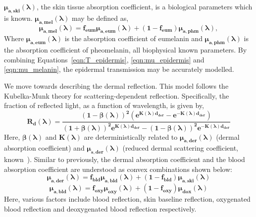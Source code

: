 $\mathbf{\boldsymbol\mu_{a,ski}(\boldsymbol\lambda)}$, the skin tissue absorption coefficient, is a biological parameters which is known. $\mathbf{\boldsymbol\mu_{a,mel}(\boldsymbol\lambda)}$ may be defined as,
\begin{equation} \label{eqn:mu_melanin}
    \mathbf{\boldsymbol\mu_{a,mel}(\boldsymbol\lambda)=f_{eum}\boldsymbol\mu_{a,eum}(\boldsymbol\lambda)+(1-f_{eum})\boldsymbol\mu_{a,phm}(\boldsymbol\lambda)},
\end{equation}
Where ${\mathbf{\boldsymbol\mu_{a,eum}(\boldsymbol\lambda)}}$ is the absorption coefficient of eumelanin and $\mathbf{\boldsymbol\mu_{a,phm}(\boldsymbol\lambda)}$ is the absorption coefficient of pheomelanin, all biophysical known parameters. By combining Equations~\ref{eqn:T_epidermis}, \ref{eqn:mu_epidermis} and \ref{eqn:mu_melanin}, the epidermal transmission may be accurately modelled.

We move towards describing the dermal reflection. This model follows the Kubelka-Munk theory for scattering-dependent reflection. Specifically, the fraction of reflected light, as a function of wavelength, is given by,
\begin{equation}
    \mathbf{R_{d}(\boldsymbol\lambda)=\frac{(1-\boldsymbol\beta(\boldsymbol\lambda))^2(e^{K(\boldsymbol\lambda)d_{der}}-e^{-K(\boldsymbol\lambda)d_{der}})}{(1+\boldsymbol\beta(\boldsymbol\lambda))^2e^{K(\boldsymbol\lambda)d_{der}}-(1-\boldsymbol\beta(\boldsymbol\lambda))^2e^{-K(\boldsymbol\lambda)d_{der}}}}
\end{equation}
Here, $\mathbf{\boldsymbol\beta(\boldsymbol\lambda)}$ and $\mathbf{K(\boldsymbol\lambda)}$ are deterministically related to $\mathbf{\boldsymbol\mu_{a,der}(\boldsymbol\lambda)}$ (dermal absorption coefficient) and $\mathbf{\boldsymbol\mu_{s,der}(\boldsymbol\lambda)}$ (reduced dermal scattering coefficient, known~\cite{anderson_optics_1981}). Similar to previously, the dermal absorption coefficient and the blood absorption coefficient are understood as convex combinations shown below:
\begin{equation}
    \mathbf{\boldsymbol\mu_{a,der}(\boldsymbol\lambda)=f_{bld}\boldsymbol\mu_{a,bld}(\boldsymbol\lambda)+(1-f_{bld})\boldsymbol\mu_{a,ski}(\boldsymbol\lambda)}
\end{equation}
\begin{equation}
    \mathbf{\boldsymbol\mu_{a,bld}(\boldsymbol\lambda)=f_{oxy}\boldsymbol\mu_{oxy}(\boldsymbol\lambda)+(1-f_{oxy})\boldsymbol\mu_{dox}(\boldsymbol\lambda)}
\end{equation}
Here, various factors include blood reflection, skin baseline reflection, oxygenated blood reflection and deoxygenated blood reflection respectively.

